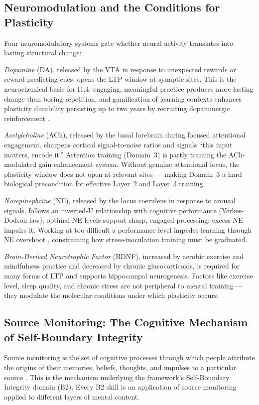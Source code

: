 \documentclass[12pt, a4paper]{article}
\begin{document}
\subsection{Neuromodulation and the Conditions for Plasticity}

Four neuromodulatory systems gate whether neural activity translates into lasting
structural change:

\emph{Dopamine} (DA), released by the VTA in response to unexpected rewards or
reward-predicting cues, opens the LTP window at synaptic sites. This is the
neurochemical basis for I1.4: engaging, meaningful practice produces more lasting
change than boring repetition, and gamification of learning contexts enhances
plasticity durability persisting up to two years by recruiting dopaminergic
reinforcement \citep{beyeler2017}.

\emph{Acetylcholine} (ACh), released by the basal forebrain during focused
attentional engagement, sharpens cortical signal-to-noise ratios and signals
``this input matters, encode it.'' Attention training (Domain~3) is partly training
the ACh-modulated gain enhancement system. Without genuine attentional focus, the
plasticity window does not open at relevant sites --- making Domain~3 a hard
biological precondition for effective Layer~2 and Layer~3 training.

\emph{Norepinephrine} (NE), released by the locus coeruleus in response to arousal
signals, follows an inverted-U relationship with cognitive performance (Yerkes-Dodson
law): optimal NE levels support sharp, engaged processing; excess NE impairs it.
Working at too difficult a performance level impedes learning through NE overshoot
\citep{beyeler2017}, constraining how stress-inoculation training must be graduated.

\emph{Brain-Derived Neurotrophic Factor} (BDNF), increased by aerobic exercise and
mindfulness practice \citep{calderone2024} and decreased by chronic glucocorticoids,
is required for many forms of LTP and supports hippocampal neurogenesis. Factors
like exercise level, sleep quality, and chronic stress are not peripheral to mental
training --- they modulate the molecular conditions under which plasticity occurs.

\subsection{Source Monitoring: The Cognitive Mechanism of Self-Boundary Integrity}

Source monitoring is the set of cognitive processes through which people attribute
the origins of their memories, beliefs, thoughts, and impulses to a particular
source \citep{johnson1993, mitchell2009}. This is the mechanism underlying the
framework's Self-Boundary Integrity domain (B2). Every B2 skill is an application
of source monitoring applied to different layers of mental content.
\end{document}
